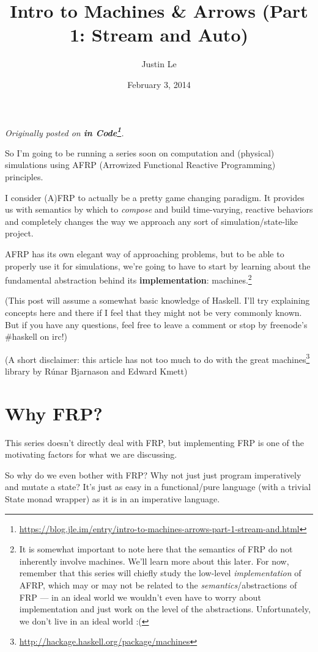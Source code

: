 \documentclass[]{article}
\title{Intro to Machines \& Arrows (Part 1: Stream and Auto)}
\author{Justin Le}
\date{February 3, 2014}
\renewcommand{\href}[2]{#2\footnote{\url{#1}}}
\begin{document}
\maketitle

\emph{Originally posted on
\textbf{\href{https://blog.jle.im/entry/intro-to-machines-arrows-part-1-stream-and.html}{in
Code}}.}

So I'm going to be running a series soon on computation and (physical)
simulations using AFRP (Arrowized Functional Reactive Programming) principles.

I consider (A)FRP to actually be a pretty game changing paradigm. It provides us
with semantics by which to \emph{compose} and build time-varying, reactive
behaviors and completely changes the way we approach any sort of
simulation/state-like project.

AFRP has its own elegant way of approaching problems, but to be able to properly
use it for simulations, we're going to have to start by learning about the
fundamental abstraction behind its \textbf{implementation}: machines.\footnote{It
  is somewhat important to note here that the semantics of FRP do not inherently
  involve machines. We'll learn more about this later. For now, remember that
  this series will chiefly study the low-level \emph{implementation} of AFRP,
  which may or may not be related to the \emph{semantics}/abstractions of FRP
  --- in an ideal world we wouldn't even have to worry about implementation and
  just work on the level of the abstractions. Unfortunately, we don't live in an
  ideal world :(}

(This post will assume a somewhat basic knowledge of Haskell. I'll try
explaining concepts here and there if I feel that they might not be very
commonly known. But if you have any questions, feel free to leave a comment or
stop by freenode's \#haskell on irc!)

(A short disclaimer: this article has not too much to do with the great
\href{http://hackage.haskell.org/package/machines}{machines} library by Rúnar
Bjarnason and Edward Kmett)

\hypertarget{why-frp}{%
\section{Why FRP?}\label{why-frp}}

This series doesn't directly deal with FRP, but implementing FRP is one of the
motivating factors for what we are discussing.

So why do we even bother with FRP? Why not just just program imperatively and
mutate a state? It's just as easy in a functional/pure language (with a trivial
State monad wrapper) as it is in an imperative language.
\end{document}
